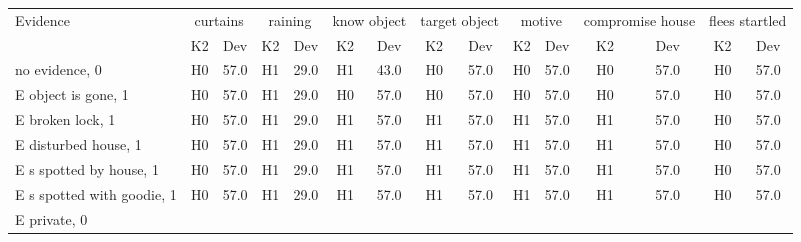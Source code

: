\begin{table}\begin{tabular}{l|cc|cc|cc|cc|cc|cc|cc}\toprule\multirow{2}{*}{Evidence} & \multicolumn{2}{c}{curtains}& \multicolumn{2}{c}{raining}& \multicolumn{2}{c}{know object}& \multicolumn{2}{c}{target object}& \multicolumn{2}{c}{motive}& \multicolumn{2}{c}{compromise house}& \multicolumn{2}{c}{flees startled}\\& {K2} & {Dev}& {K2} & {Dev}& {K2} & {Dev}& {K2} & {Dev}& {K2} & {Dev}& {K2} & {Dev}& {K2} & {Dev}\\\midrule
no evidence, 0 & \cellcolor{Bittersweet}H0&\cellcolor{Bittersweet}57.0&\cellcolor{Bittersweet}H1&\cellcolor{Bittersweet}29.0&\cellcolor{Bittersweet}H1&\cellcolor{Bittersweet}43.0&\cellcolor{Bittersweet}H0&\cellcolor{Bittersweet}57.0&\cellcolor{Bittersweet}H0&\cellcolor{Bittersweet}57.0&\cellcolor{Bittersweet}H0&\cellcolor{Bittersweet}57.0&\cellcolor{Bittersweet}H0&\cellcolor{Bittersweet}57.0\\E object is gone, 1 & \cellcolor{Bittersweet}H0&\cellcolor{Bittersweet}57.0&\cellcolor{Bittersweet}H1&\cellcolor{Bittersweet}29.0&\cellcolor{Bittersweet}H0&\cellcolor{Bittersweet}57.0&\cellcolor{Bittersweet}H0&\cellcolor{Bittersweet}57.0&\cellcolor{Bittersweet}H0&\cellcolor{Bittersweet}57.0&\cellcolor{Bittersweet}H0&\cellcolor{Bittersweet}57.0&\cellcolor{Bittersweet}H0&\cellcolor{Bittersweet}57.0\\E broken lock, 1 & \cellcolor{Bittersweet}H0&\cellcolor{Bittersweet}57.0&\cellcolor{Bittersweet}H1&\cellcolor{Bittersweet}29.0&\cellcolor{Bittersweet}H1&\cellcolor{Bittersweet}57.0&\cellcolor{Bittersweet}H1&\cellcolor{Bittersweet}57.0&\cellcolor{Bittersweet}H1&\cellcolor{Bittersweet}57.0&\cellcolor{Bittersweet}H1&\cellcolor{Bittersweet}57.0&\cellcolor{Bittersweet}H0&\cellcolor{Bittersweet}57.0\\E disturbed house, 1 & \cellcolor{Bittersweet}H0&\cellcolor{Bittersweet}57.0&\cellcolor{Bittersweet}H1&\cellcolor{Bittersweet}29.0&\cellcolor{Bittersweet}H1&\cellcolor{Bittersweet}57.0&\cellcolor{Bittersweet}H1&\cellcolor{Bittersweet}57.0&\cellcolor{Bittersweet}H1&\cellcolor{Bittersweet}57.0&\cellcolor{Bittersweet}H1&\cellcolor{Bittersweet}57.0&\cellcolor{Bittersweet}H0&\cellcolor{Bittersweet}57.0\\E s spotted by house, 1 & \cellcolor{Bittersweet}H0&\cellcolor{Bittersweet}57.0&\cellcolor{Bittersweet}H1&\cellcolor{Bittersweet}29.0&\cellcolor{Bittersweet}H1&\cellcolor{Bittersweet}57.0&\cellcolor{Bittersweet}H1&\cellcolor{Bittersweet}57.0&\cellcolor{Bittersweet}H1&\cellcolor{Bittersweet}57.0&\cellcolor{Bittersweet}H1&\cellcolor{Bittersweet}57.0&\cellcolor{Bittersweet}H0&\cellcolor{Bittersweet}57.0\\E s spotted with goodie, 1 & \cellcolor{Bittersweet}H0&\cellcolor{Bittersweet}57.0&\cellcolor{Bittersweet}H1&\cellcolor{Bittersweet}29.0&\cellcolor{Bittersweet}H1&\cellcolor{Bittersweet}57.0&\cellcolor{Bittersweet}H1&\cellcolor{Bittersweet}57.0&\cellcolor{Bittersweet}H1&\cellcolor{Bittersweet}57.0&\cellcolor{Bittersweet}H1&\cellcolor{Bittersweet}57.0&\cellcolor{Bittersweet}H0&\cellcolor{Bittersweet}57.0\\E private, 0 & 
\end{tabular}
\end{table}
